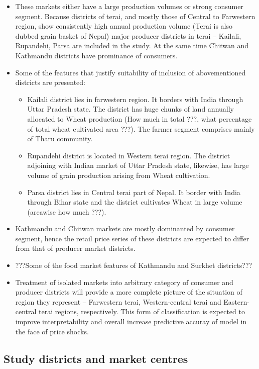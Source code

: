 \documentclass[
  12pt,
]{article}
\providecommand{\tightlist}{%
  \setlength{\itemsep}{0pt}\setlength{\parskip}{0pt}}
\begin{document}
\begin{itemize}
\tightlist
\item
  These markets either have a large production volumes or strong consumer segment. Because districts of terai, and mostly those of Central to Farwestern region, show consistently high annual production volume (Terai is also dubbed grain basket of Nepal) major producer districts in terai -- Kailali, Rupandehi, Parsa are included in the study. At the same time Chitwan and Kathmandu districts have prominance of consumers.
\item
  Some of the features that justify suitability of inclusion of abovementioned districts are presented:

  \begin{itemize}
  \tightlist
  \item
    Kailali district lies in farwestern region. It borders with India through Uttar Pradesh state. The district has huge chunks of land annually allocated to Wheat production (How much in total ???, what percentage of total wheat cultivated area ???). The farmer segment comprises mainly of Tharu community.
  \item
    Rupandehi district is located in Western terai region. The district adjoining with Indian market of Uttar Pradesh state, likewise, has large volume of grain production arising from Wheat cultivation.
  \item
    Parsa district lies in Central terai part of Nepal. It border with India through Bihar state and the district cultivates Wheat in large volume (areawise how much ???).
  \end{itemize}
\item
  Kathmandu and Chitwan markets are mostly dominanted by consumer segment, hence the retail price series of these districts are expected to differ from that of producer market districts.
\item
  ???Some of the food market features of Kathmandu and Surkhet districts???
\item
  Treatment of isolated markets into arbitrary category of consumer and producer districts will provide a more complete picture of the situation of region they represent -- Farwestern terai, Western-central terai and Eastern-central terai regions, respectively. This form of classification is expected to improve interpretability and overall increase predictive accuray of model in the face of price shocks.
\end{itemize}

\hypertarget{study-districts-and-market-centres}{%
\subsection{Study districts and market centres}\label{study-districts-and-market-centres}}
\end{document}

